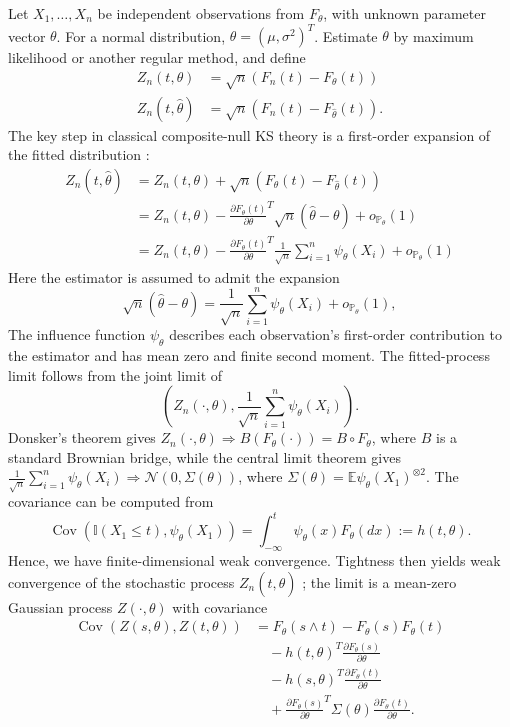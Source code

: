 \documentclass[preprint,12pt]{elsarticle}
\newcommand{\Cov}{\operatorname{Cov}}
\theoremstyle{plain}
\theoremstyle{remark}
\begin{document}
Let $X_1,\ldots,X_n$ be independent observations from $F_\theta$, with
unknown parameter vector $\theta$. For a normal distribution,
$\theta=(\mu,\sigma^2)^T$. Estimate $\theta$ by maximum likelihood or
another regular method, and define
\begin{align}
    Z_n(t,\theta)&=\sqrt{n}\left(F_n(t)-F_\theta(t)\right)\\
    Z_n(t,\widehat{\theta})&=\sqrt{n}\left(F_n(t)-F_{\widehat{\theta}}(t)\right).
\end{align}
The key step in classical composite-null KS theory is a first-order expansion
of the fitted distribution
\citep{durbin1973weak,babu2004goodness,van2000asymptotic,del2007lectures}:
\begin{align*}
    Z_n(t,\widehat{\theta})&=Z_n(t,\theta)+\sqrt{n}\left(F_\theta(t)-F_{\widehat{\theta}}(t)\right)\\
    &=Z_n(t,\theta)-\frac{\partial F_\theta(t)}{\partial\theta}^T\sqrt{n}(\widehat{\theta}-\theta)+o_{\mathbb{P}_\theta}(1)\\
    &=Z_n(t,\theta)-\frac{\partial F_\theta(t)}{\partial\theta}^T\frac{1}{\sqrt{n}}\sum_{i=1}^n\psi_\theta(X_i)+o_{\mathbb{P}_\theta}(1)
\end{align*}
Here the estimator is assumed to admit the expansion
\[
\sqrt{n}(\widehat{\theta}-\theta)=\frac{1}{\sqrt{n}}\sum_{i=1}^n\psi_\theta(X_i)+o_{\mathbb{P}_\theta}(1),
\]
The influence function $\psi_\theta$ describes each observation's
first-order contribution to the estimator and has mean zero and finite
second moment. The fitted-process limit follows from the joint limit of
\[
\left(Z_n(\cdot,\theta),\frac{1}{\sqrt{n}}\sum_{i=1}^n\psi_\theta(X_i)\right).
\]
Donsker's theorem gives $Z_n(\cdot,\theta)\Rightarrow B(F_\theta(\cdot))=B\circ F_\theta$, where $B$ is a standard Brownian bridge, while the central limit theorem gives $\frac{1}{\sqrt{n}}\sum_{i=1}^n\psi_\theta(X_i)\Rightarrow \mathcal{N}(0,\Sigma(\theta))$, where $\Sigma(\theta)=\mathbb{E}\psi_\theta(X_1)^{\otimes 2}$. The covariance can be computed from
\[
\Cov(\mathbb{I}(X_1\le t),\psi_\theta(X_1))=\int_{-\infty}^t\psi_\theta(x)F_\theta(dx):=h(t,\theta).
\]
Hence, we have finite-dimensional weak convergence. Tightness then yields weak convergence of the stochastic process $Z_n(t,\widehat{\theta})$ \citep{babu2004goodness}; the limit is a mean-zero Gaussian process $Z(\cdot,\theta)$ with covariance
\begin{align}\label{eq:cov}
    \Cov\left(Z(s,\theta),Z(t,\theta)\right)
    &=F_\theta(s\wedge t)-F_\theta(s)F_\theta(t)\\
    &\quad-h(t,\theta)^T\frac{\partial F_\theta(s)}{\partial \theta}\nonumber\\
    &\quad-h(s,\theta)^T\frac{\partial F_\theta(t)}{\partial \theta}\nonumber\\
    &\quad+\frac{\partial F_\theta(s)}{\partial\theta}^T
      \Sigma(\theta)
      \frac{\partial F_\theta(t)}{\partial\theta}.\nonumber
\end{align}
\end{document}
